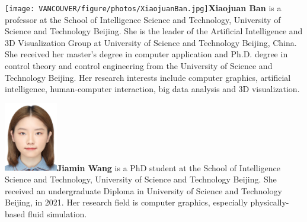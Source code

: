\documentclass[VANCOUVER,STIX1COL]{WileyNJD-v2}
\providecommand{\DIFaddbegin}{} %
\providecommand{\DIFaddend}{} %
\providecommand{\DIFdelbegin}{} %
\providecommand{\DIFdelend}{} %
\begin{document}
\vspace{4.15ex}

\DIFdelbegin %
\DIFdelend \DIFaddbegin \begin{biography}{
\vspace{4ex}
\texttt{[image: VANCOUVER/figure/photos/XiaojuanBan.jpg]}}{\textbf{Xiaojuan Ban} is a professor at the School of Intelligence Science and Technology, University of Science and Technology Beijing. She is the leader of the Artificial Intelligence and 3D Visualization Group at University of Science and Technology Beijing, China. She received her master's degree in computer application and Ph.D. degree in control theory and control engineering from the University of Science and Technology Beijing. Her research interests include computer graphics, artificial intelligence, human-computer interaction, big data analysis and 3D visualization.}
\DIFaddend \end{biography}

\DIFdelbegin %

\DIFdelend \DIFaddbegin \begin{biography}{\includegraphics[width=66pt,height=86pt]{VANCOUVER/figure/photos/JiaminWang.jpg}}{\textbf{Jiamin Wang} is a PhD student  at the School of Intelligence Science and Technology, University of Science and Technology Beijing. She received an undergraduate Diploma in University of Science and Technology Beijing, in 2021. Her research field is computer graphics, especially physically-based fluid simulation.}
\DIFaddend \end{biography}
\end{document}
